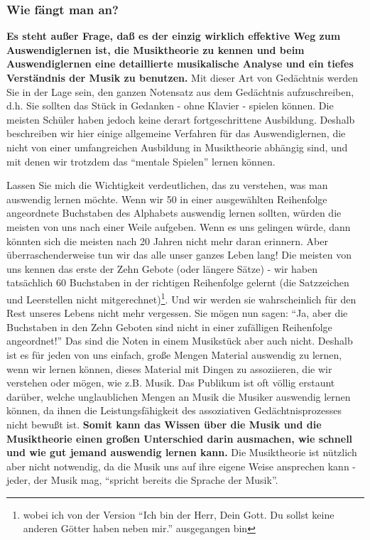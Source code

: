 
\subsubsection{Wie fängt man an?}
\label{c1iii6e}

\textbf{Es steht außer Frage, daß es der einzig wirklich effektive Weg zum Auswendiglernen ist, die Musiktheorie zu kennen und beim Auswendiglernen eine detaillierte musikalische Analyse und ein tiefes Verständnis der Musik zu benutzen.}
Mit dieser Art von Gedächtnis werden Sie in der Lage sein, den ganzen Notensatz aus dem Gedächtnis aufzuschreiben, d.h. Sie sollten das Stück in Gedanken - ohne Klavier - spielen können.
Die meisten Schüler haben jedoch keine derart fortgeschrittene Ausbildung.
Deshalb beschreiben wir hier einige allgemeine Verfahren für das Auswendiglernen, die nicht von einer umfangreichen Ausbildung in Musiktheorie abhängig sind, und mit denen wir trotzdem das \enquote{mentale Spielen} lernen können.

Lassen Sie mich die Wichtigkeit verdeutlichen, das zu verstehen, was man auswendig lernen möchte.
Wenn wir 50 in einer ausgewählten Reihenfolge angeordnete Buchstaben des Alphabets auswendig lernen sollten, würden die meisten von uns nach einer Weile aufgeben.
Wenn es uns gelingen würde, dann könnten sich die meisten nach 20 Jahren nicht mehr daran erinnern.
Aber überraschenderweise tun wir das alle unser ganzes Leben lang!
Die meisten von uns kennen das erste der Zehn Gebote (oder längere Sätze) - wir haben tatsächlich 60 Buchstaben in der richtigen Reihenfolge gelernt (die Satzzeichen und Leerstellen nicht mitgerechnet)\footnote{wobei ich von der Version \enquote{Ich bin der Herr, Dein Gott. Du sollst keine anderen Götter haben neben mir.} ausgegangen bin}.
Und wir werden sie wahrscheinlich für den Rest unseres Lebens nicht mehr vergessen.
Sie mögen nun sagen: \enquote{Ja, aber die Buchstaben in den Zehn Geboten sind nicht in einer zufälligen Reihenfolge angeordnet!}
Das sind die Noten in einem Musikstück aber auch nicht.
Deshalb ist es für jeden von uns einfach, große Mengen Material auswendig zu lernen, wenn wir lernen können, dieses Material mit Dingen zu assoziieren, die wir verstehen oder mögen, wie z.B. Musik.
Das Publikum ist oft völlig erstaunt darüber, welche unglaublichen Mengen an Musik die Musiker auswendig lernen können, da ihnen die Leistungsfähigkeit des assoziativen Gedächtnisprozesses nicht bewußt ist.
\textbf{Somit kann das Wissen über die Musik und die Musiktheorie einen großen Unterschied darin ausmachen, wie schnell und wie gut jemand auswendig lernen kann.}
Die Musiktheorie ist nützlich aber nicht notwendig, da die Musik uns auf ihre eigene Weise ansprechen kann - jeder, der Musik mag, \enquote{spricht bereits die Sprache der Musik}.

